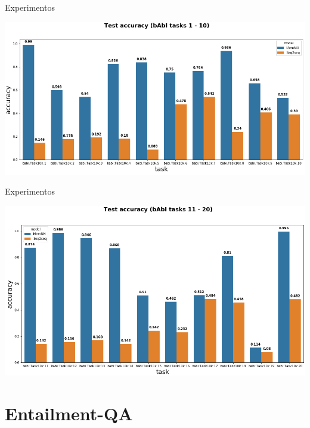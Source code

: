 \documentclass[10pt]{beamer}
\begin{document}
\begin{frame}{Experimentos}
\begin{center}
\includegraphics[scale=0.34]{images/comparative_results_babi1.png}
\end{center}
\end{frame}

\begin{frame}{Experimentos}
\begin{center}
\includegraphics[scale=0.34]{images/comparative_results_babi2.png}
\end{center}
\end{frame}




\section{Entailment-QA}
\end{document}
